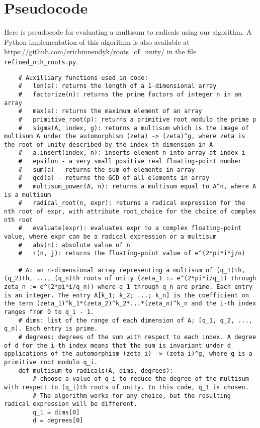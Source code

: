 \documentclass{article}
\begin{document}
\section{Pseudocode}
    Here is pseudocode for evaluating a multisum to radicals using our algorithm. A Python implementation of this algorithm is also available at \url{https://github.com/ericbinnendyk/roots_of_unity/} in the file \verb|refined_nth_roots.py|.
    \begin{lstlisting}
    # Auxilliary functions used in code:
    #   len(a): returns the length of a 1-dimensional array
    #   factorize(n): returns the prime factors of integer n in an array
    #   max(a): returns the maximum element of an array
    #   primitive_root(p): returns a primitive root modulo the prime p
    #   sigma(A, index, g): returns a multisum which is the image of multisum A under the automorphism (zeta) -> (zeta)^g, where zeta is the root of unity described by the index-th dimension in A
    #   a.insert(index, n): inserts element n into array at index i
    #   epsilon - a very small positive real floating-point number
    #   sum(a) - returns the sum of elements in array
    #   gcd(a) - returns the GCD of all elements in array
    #   multisum_power(A, n): returns a multisum equal to A^n, where A is a multisum
    #   radical_root(n, expr): returns a radical expression for the nth root of expr, with attribute root_choice for the choice of complex nth root
    #   evaluate(expr): evaluates expr to a complex floating-point value, where expr can be a radical expression or a multisum
    #   abs(n): absolute value of n
    #   r(n, j): returns the floating-point value of e^(2*pi*i*j/n)

    # A: an n-dimensional array representing a multisum of (q_1)th, (q_2)th, ..., (q_n)th roots of unity (zeta_1 := e^(2*pi*i/q_1) through zeta_n := e^(2*pi*i/q_n)) where q_1 through q_n are prime. Each entry is an integer. The entry A[k_1; k_2; ...; k_n] is the coefficient on the term (zeta_1)^k_1*(zeta_2)^k_2*...*(zeta_n)^k_n and the i-th index ranges from 0 to q_i - 1.
    # dims: list of the range of each dimension of A; [q_1, q_2, ..., q_n]. Each entry is prime.
    # degrees: degrees of the sum with respect to each index. A degree of d for the i-th index means that the sum is invariant under d applications of the automorphism (zeta_i) -> (zeta_i)^g, where g is a primitive root modulo q_i.
    def multisum_to_radicals(A, dims, degrees):
        # choose a value of q_i to reduce the degree of the multisum with respect to (q_i)th roots of unity. In this code, q_1 is chosen.
        # The algorithm works for any choice, but the resulting radical expression will be different.
        q_1 = dims[0]
        d = degrees[0]


\end{lstlisting}
\end{document}
